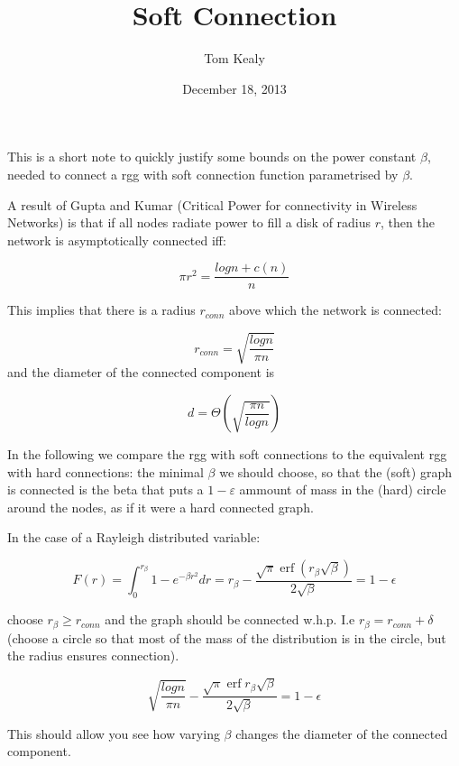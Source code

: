 \documentclass[11pt]{article}
\DeclareMathOperator\erf{erf}
\begin{document}
\title{Soft Connection}
\author{Tom Kealy}

\date{December 18, 2013}

\maketitle

This is a short note to quickly justify some bounds on the power constant \(\beta\), needed to connect a rgg with soft connection function parametrised by \(\beta\). 

A result of Gupta and Kumar (Critical Power for connectivity in Wireless Networks) is that if all nodes radiate power to fill a disk of radius \(r\), then the network is asymptotically connected iff: 

\begin{equation}
\pi r^2 = \frac{log{n}+c\left(n\right)}{n}
\end{equation}

This implies that there is a radius \(r_{conn}\) above which the network is connected: 

\begin{equation}
r_{conn} = \sqrt{\frac{log{n}}{\pi n}}
\end{equation}
and the diameter of the connected component is

\begin{equation}
d = \Theta\left(\sqrt{\frac{\pi n}{log{n}}}\right)
\end{equation}

In the following we compare the rgg with soft connections to the equivalent rgg with hard connections: the minimal \(\beta\) we should choose, so that the (soft) graph is connected is the beta that puts a \(1 - \varepsilon\) ammount of mass in the (hard) circle around the nodes, as if it were a hard connected graph.

In the case of a Rayleigh distributed variable:

\begin{equation}
F\left(r\right) = \int_0^{r_\beta} 1 - e^{-\beta r^2} dr = r_\beta	- \frac{\sqrt{\pi} \erf{\left(r_\beta \sqrt{\beta}\right)}}{2\sqrt{\beta}} = 1 - \epsilon
\end{equation}

choose \(r_\beta \geq r_{conn}\) and the graph should be connected w.h.p. I.e \(r_\beta	 = r_{conn} + \delta\) (choose a circle so that most of the mass of the distribution is in the circle, but the radius ensures connection).

\begin{equation}
\sqrt{\frac{log{n}}{\pi n}} - \frac{\sqrt{\pi} \erf{r_\beta}\sqrt{\beta}}{2\sqrt{\beta}} = 1 - \epsilon
\end{equation}

This should allow you see how varying \(\beta\) changes the diameter of the connected component. 
\end{document}

